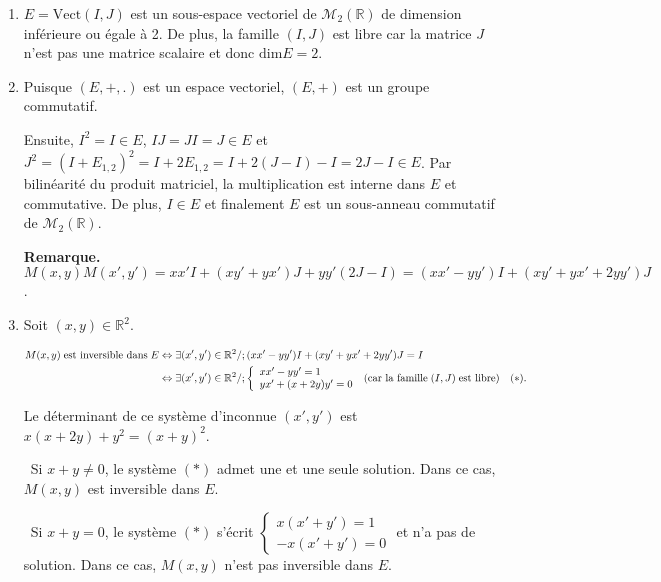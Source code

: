 \documentclass[11pt,a4paper]{article}
\newcommand{\Rr}{\mathbb{R}} \newcommand{\R}{\mathbb{R}}
\begin{document}
\begin{enumerate}
 \item  $E=\text{Vect}(I,J)$ est un sous-espace vectoriel de $\mathcal{M}_2(\Rr)$ de dimension inférieure ou égale à 2. De plus, la famille $(I,J)$ est libre car la matrice $J$ n'est pas une matrice scalaire et donc $\text{dim}E= 2$.

\item  Puisque $(E,+,.)$ est un espace vectoriel, $(E,+)$ est un groupe commutatif.

Ensuite, $I^2=I\in E$, $IJ=JI=J\in E$ et $J^2=(I + E_{1,2})^2=I +2E_{1,2}= I+2(J-I) - I =2J -I\in E$. Par bilinéarité du produit matriciel, la multiplication est interne dans $E$ et commutative. De plus, $I\in E$ et finalement $E$ est un sous-anneau commutatif de $\mathcal{M}_2(\Rr)$.

 
\textbf{Remarque.} $M(x,y)M(x',y')= xx'I +(xy'+yx')J +yy'(2J-I)= (xx'-yy')I + (xy'+yx'+2yy')J$.

\item  Soit $(x,y)\in\Rr^2$. 

\begin{align*}\ensuremath
M(x,y)\;\text{est inversible dans}\;E&\Leftrightarrow\exists(x',y')\in\Rr^2/;(xx'-yy')I + (xy'+yx'+2yy')J=I\\
 &\Leftrightarrow\exists(x',y')\in\Rr^2/;\left\{
 \begin{array}{l}
 xx'-yy'=1\\
 yx'+(x+2y)y'=0
 \end{array}
 \right.\;(\text{car la famille}\;(I,J)\;\text{est libre})\quad(*).
\end{align*}

Le déterminant de ce système d'inconnue $(x',y')$ est $x(x+2y)+y^2=(x+y)^2$.

 

\textbullet~Si $x+y\neq0$, le système $(*)$ admet une et une seule solution. Dans ce cas, $M(x,y)$ est inversible dans $E$.

\textbullet~Si $x+y=0$, le système $(*)$ s'écrit $\left\{
 \begin{array}{l}
 x(x'+y')=1\\
 -x(x'+y')=0
 \end{array}
 \right.$ et n'a pas de solution. Dans ce cas, $M(x,y)$ n'est pas inversible dans $E$.
 
 \begin{center}
 \end{center}
 


\end{enumerate}
\end{document}
